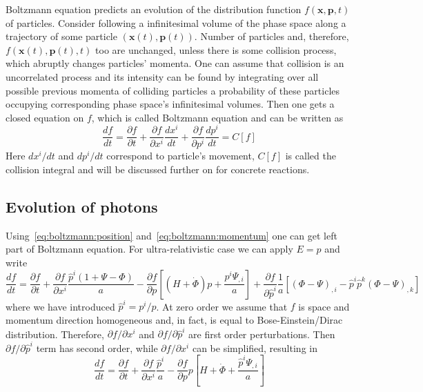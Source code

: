 \documentclass[12pt]{extarticle}
\numberwithin{problem}{section}
\numberwithin{theorem}{section}
\begin{document}
	Boltzmann equation predicts an evolution of the distribution function $f(\mathbf{x},\mathbf{p},t)$ of particles. Consider following a infinitesimal volume of the phase space along a trajectory of some particle $(\mathbf{x}(t),\mathbf{p}(t))$. Number of particles and, therefore, $f(\mathbf{x}(t),\mathbf{p}(t), t)$ too are unchanged, unless there is some collision process, which abruptly changes particles' momenta. One can assume that collision is an uncorrelated process and its intensity can be found by integrating over all possible previous momenta of colliding particles a probability of these particles occupying corresponding phase space's infinitesimal volumes. Then one gets a closed equation on $f$, which is called Boltzmann equation and can be written as 
	\begin{equation}
		\frac{df}{dt} = \frac{\partial f}{\partial t} + \frac{\partial f}{\partial x^i} \frac{dx^i}{dt} + \frac{\partial f}{\partial p^i} \frac{dp^i}{dt} = C[f]
	\end{equation}
	Here $dx^i/dt$ and $dp^i/dt$ correspond to particle's movement, $C[f]$ is called the collision integral and will be discussed further on for concrete reactions.
	
	\subsection{Evolution of photons}
	Using~\ref{eq:boltzmann:position} and~\ref{eq:boltzmann:momentum} one can get left part of Boltzmann equation. For ultra-relativistic case we can apply $E = p$ and write
	\begin{equation}
		\label{eq:boltzmann:photon}
		\frac{df}{dt} = \frac{\partial f}{\partial t} + \frac{\partial f}{\partial x^i}\frac{\hat{p}^i(1 + \Psi - \Phi)}{a} - \frac{\partial f}{\partial p}\left[(H + \dot{\Phi})p + \frac{p^i\Psi_{,i}}{a}\right] + \frac{\partial f}{\partial \hat{p}^i}\frac{1}{a}\left[(\Phi - \Psi)_{,i} - \hat{p}^i\hat{p}^k(\Phi - \Psi)_{,k}\right]
	\end{equation}
	where we have introduced $\hat{p}^i = p^i / p$. At zero order we assume that $f$ is space and momentum direction homogeneous and, in fact, is equal to Bose-Einstein/Dirac distribution. Therefore, $\partial f/\partial x^i$ and $\partial f/\partial \hat{p}^i$ are first order perturbations. Then $\partial f/\partial\hat{p}^i$ term has second order, while $\partial f/\partial x^i$ can be simplified, resulting in
	\begin{equation}
		\label{eq:boltzmann:photon-left}
		\frac{df}{dt} = \frac{\partial f}{\partial t} + \frac{\partial f}{\partial x^i}\frac{\hat{p}^i}{a} - \frac{\partial f}{\partial p}p\left[H + \dot{\Phi} + \frac{\hat{p}^i\Psi_{,i}}{a}\right]
	\end{equation}
\end{document}

